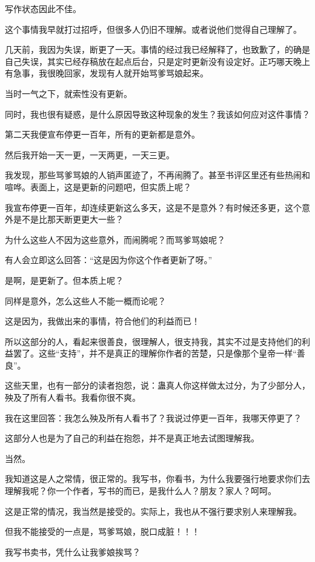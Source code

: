 \begin{this_body}
写作状态因此不佳。

这个事情我早就打过招呼，但很多人仍旧不理解。或者说他们觉得自己理解了。

几天前，我因为失误，断更了一天。事情的经过我已经解释了，也致歉了，的确是自己失误，其实已经存稿放在起点后台，只是定时更新没有设定好。正巧哪天晚上有急事，我很晚回家，发现有人就开始骂爹骂娘起来。

当时一气之下，就索性没有更新。

同时，我也很有疑惑，是什么原因导致这种现象的发生？我该如何应对这件事情？

第二天我便宣布停更一百年，所有的更新都是意外。

然后我开始一天一更，一天两更，一天三更。

我发现，那些骂爹骂娘的人销声匿迹了，不再闹腾了。甚至书评区里还有些热闹和喧哗。表面上，这是更新的问题吧，但实质上呢？

我宣布停更一百年，却连续更新这么多天，这是不是意外？有时候还多更，这个意外是不是比那天断更更大一些？

为什么这些人不因为这些意外，而闹腾呢？而骂爹骂娘呢？

有人会立即这么回答：“这是因为你这个作者更新了呀。”

是啊，是更新了。但本质上呢？

同样是意外，怎么这些人不能一概而论呢？

这是因为，我做出来的事情，符合他们的利益而已！

所以这部分的人，看起来很善良，很理解人，很支持我，其实不过是支持他们的利益罢了。这些“支持”，并不是真正的理解你作者的苦楚，只是像那个皇帝一样“善良”。

这些天里，也有一部分的读者抱怨，说：蛊真人你这样做太过分，为了少部分人，殃及了所有人看书。我看你很不爽。

我在这里回答：我怎么殃及所有人看书了？我说过停更一百年，我哪天停更了？

这部分人也是为了自己的利益在抱怨，并不是真正地去试图理解我。

当然。

我知道这是人之常情，很正常的。我写书，你看书，为什么我要强行地要求你们去理解我呢？你一个作者，写书的而已，是我什么人？朋友？家人？呵呵。

这是正常的情况，我当然是接受的。实际上，我也从不强行要求别人来理解我。

但我不能接受的一点是，骂爹骂娘，脱口成脏！！！

我写书卖书，凭什么让我爹娘挨骂？


\end{this_body}
